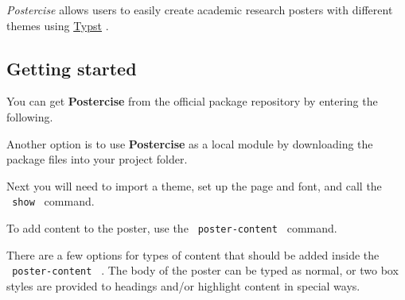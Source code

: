 \label{readme}
\emph{Postercise} allows users to easily create academic research
posters with different themes using \href{https://typst.app/}{Typst} .


\subsection{Getting started}\label{getting-started}

You can get \textbf{Postercise} from the official package repository by
entering the following.

\begin{Shaded}
\begin{Highlighting}[]
\end{Highlighting}
\end{Shaded}

Another option is to use \textbf{Postercise} as a local module by
downloading the package files into your project folder.

Next you will need to import a theme, set up the page and font, and call
the \texttt{\ show\ } command.

\begin{Shaded}
\begin{Highlighting}[]


\end{Highlighting}
\end{Shaded}

To add content to the poster, use the \texttt{\ poster-content\ }
command.

\begin{Shaded}
\begin{Highlighting}[]
\NormalTok{\#poster{-}content()[}
\NormalTok{]}
\end{Highlighting}
\end{Shaded}

There are a few options for types of content that should be added inside
the \texttt{\ poster-content\ } . The body of the poster can be typed as
normal, or two box styles are provided to headings and/or highlight
content in special ways.

